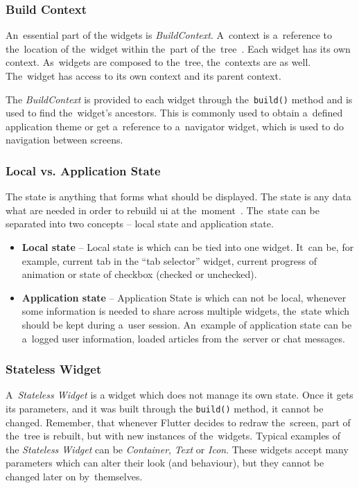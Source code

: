 \subsubsection{Build Context}
An~essential part of the widgets is \textit{BuildContext}. A~context is a~reference to the~location of the~widget within the~part of the~tree~\cite{notion-widget-didier}. Each widget has its own context. As~widgets are composed to the~tree, the~contexts are as well. The~widget has access to its own context and its parent context. 

The \textit{BuildContext} is provided to each widget through the~\verb|build()| method and is used to find the~widget's ancestors. This is commonly used to obtain a~defined application theme or get a~reference to a~navigator widget, which is used to do navigation between screens. 
\subsubsection{Local vs. Application State}
The state is anything that forms what should be displayed. The state is any data what are needed in order to rebuild \gls{ui} at the~moment~\cite{flutter-local-app-state}. The~state can be separated into two concepts -- local state and application state. 

\begin{itemize}
    \item \textbf{Local state} -- Local state is which can be tied into one widget. It~can be, for example, current tab in the ``tab selector'' widget, current progress of animation or state of checkbox (checked or unchecked).
    \item \textbf{Application state} -- Application State is which can not be local, whenever some information is needed to share across multiple widgets, the~state which should be kept during a~user session. An~example of application state can be a~logged user information, loaded articles from the~server or chat messages.
\end{itemize}
\subsubsection{Stateless Widget}
A~\textit{Stateless Widget} is a widget which does not manage its own state. Once it gets its parameters, and it was built through the \verb|build()| method, it cannot be changed. Remember, that whenever Flutter decides to redraw the~screen, part of the~tree is rebuilt, but with new instances of the~widgets. Typical examples of the \textit{Stateless Widget} can be \textit{Container}, \textit{Text} or \textit{Icon}. These widgets accept many parameters which can alter their look (and behaviour), but they cannot be changed later on by~themselves. 

